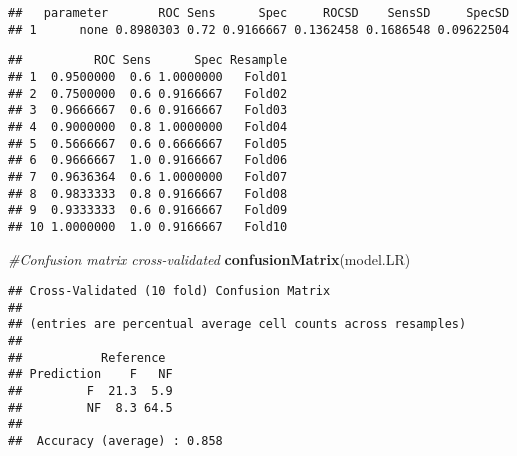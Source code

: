 \documentclass[
]{book}
\newenvironment{Shaded}{\begin{snugshade}}{\end{snugshade}}
\newcommand{\AttributeTok}[1]{\textcolor[rgb]{0.13,0.29,0.53}{#1}}
\newcommand{\CommentTok}[1]{\textcolor[rgb]{0.56,0.35,0.01}{\textit{#1}}}
\newcommand{\FunctionTok}[1]{\textcolor[rgb]{0.13,0.29,0.53}{\textbf{#1}}}
\newcommand{\NormalTok}[1]{#1}
\newcommand{\OtherTok}[1]{\textcolor[rgb]{0.56,0.35,0.01}{#1}}
\newcommand{\SpecialCharTok}[1]{\textcolor[rgb]{0.81,0.36,0.00}{\textbf{#1}}}
\begin{document}
\begin{Shaded}
\end{Shaded}

\begin{verbatim}
##   parameter       ROC Sens      Spec     ROCSD    SensSD     SpecSD
## 1      none 0.8980303 0.72 0.9166667 0.1362458 0.1686548 0.09622504
\end{verbatim}

\begin{Shaded}
\end{Shaded}

\begin{verbatim}
##          ROC Sens      Spec Resample
## 1  0.9500000  0.6 1.0000000   Fold01
## 2  0.7500000  0.6 0.9166667   Fold02
## 3  0.9666667  0.6 0.9166667   Fold03
## 4  0.9000000  0.8 1.0000000   Fold04
## 5  0.5666667  0.6 0.6666667   Fold05
## 6  0.9666667  1.0 0.9166667   Fold06
## 7  0.9636364  0.6 1.0000000   Fold07
## 8  0.9833333  0.8 0.9166667   Fold08
## 9  0.9333333  0.6 0.9166667   Fold09
## 10 1.0000000  1.0 0.9166667   Fold10
\end{verbatim}

\begin{Shaded}
\begin{Highlighting}[]
\CommentTok{\#Confusion matrix cross{-}validated}
\FunctionTok{confusionMatrix}\NormalTok{(model.LR)}
\end{Highlighting}
\end{Shaded}

\begin{verbatim}
## Cross-Validated (10 fold) Confusion Matrix 
## 
## (entries are percentual average cell counts across resamples)
##  
##           Reference
## Prediction    F   NF
##         F  21.3  5.9
##         NF  8.3 64.5
##                            
##  Accuracy (average) : 0.858
\end{verbatim}

\begin{Shaded}
\end{Shaded}
\end{document}
